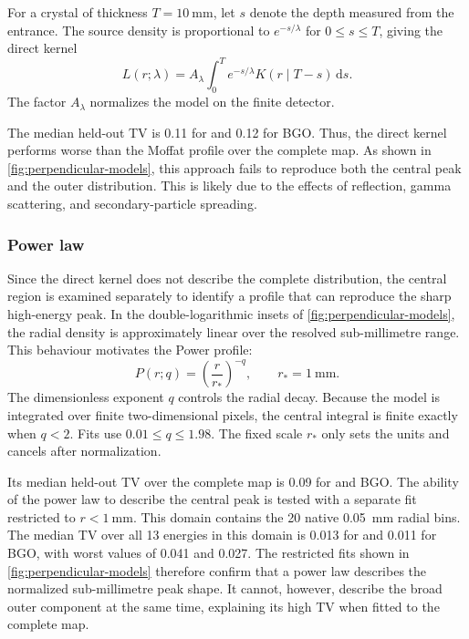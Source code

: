 For a crystal of thickness $T=\qty{10}{\milli\metre}$, let $s$ denote the depth measured from the entrance. The source density is proportional to $e^{-s/\lambda}$ for $0\leq s\leq T$, giving the direct kernel
\begin{equation}
  L(r;\lambda)=A_\lambda\int_0^T
  e^{-s/\lambda}K(r\mid T-s)\,\mathrm ds.
\end{equation}
The factor $A_\lambda$ normalizes the model on the finite detector.

The median held-out TV is 0.11 for  and 0.12 for BGO. Thus, the direct kernel performs worse than the Moffat profile over the complete map. As shown in \cref{fig:perpendicular-models}, this approach fails to reproduce both the central peak and the outer distribution. This is likely due to the effects of reflection, gamma scattering, and secondary-particle spreading.

\subsubsection{Power law}

Since the direct kernel does not describe the complete distribution, the central region is examined separately to identify a profile that can reproduce the sharp high-energy peak. In the double-logarithmic insets of \cref{fig:perpendicular-models}, the radial density is approximately linear over the resolved sub-millimetre range. This behaviour motivates the Power profile:
\begin{equation}
  P(r;q)=\left(\frac{r}{r_*}\right)^{-q},\qquad r_*=\qty{1}{\milli\metre}.
\end{equation}
The dimensionless exponent $q$ controls the radial decay.
Because the model is integrated over finite two-dimensional pixels, the central integral is finite exactly when $q<2$. Fits use $0.01\leq q\leq1.98$. The fixed scale $r_*$ only sets the units and cancels after normalization.

Its median held-out TV over the complete map is 0.09 for  and BGO. The ability of the power law to describe the central peak is tested with a separate fit restricted to $r<\qty{1}{\milli\metre}$. This domain contains the 20 native \qty{0.05}{\milli\metre} radial bins. The median TV over all 13 energies in this domain is 0.013 for  and 0.011 for BGO, with worst values of 0.041 and 0.027. The restricted fits shown in \cref{fig:perpendicular-models} therefore confirm that a power law describes the normalized sub-millimetre peak shape. It cannot, however, describe the broad outer component at the same time, explaining its high TV when fitted to the complete map.

